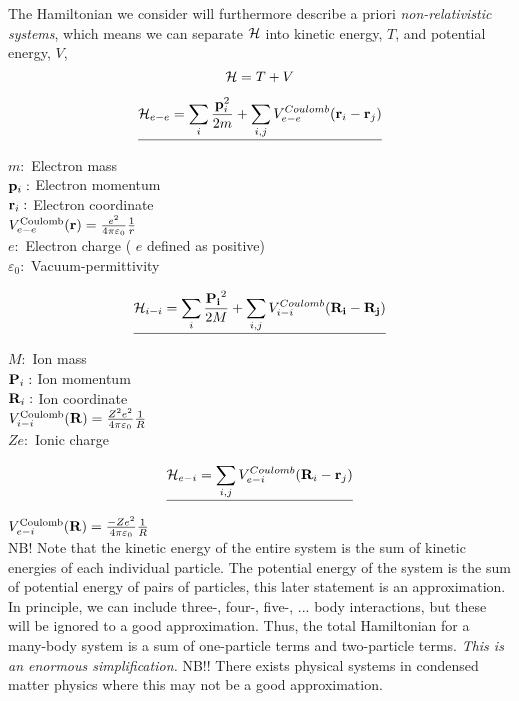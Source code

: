 \noindent The Hamiltonian we consider will furthermore describe a priori \emph{non-relativistic systems}, which means we can separate $\mathcal{H}$ into kinetic energy, $T$, and potential energy, $V$,
\begin{equation}
	\mathcal{H} = T+V
\end{equation}

\begin{equation}
	\emph{\mathcal{H}_{e-e}= \sum_{i} \frac{\vb{p}_i^2}{2m}+ \sum_{i,j} V_{e-e}^{Coulomb} (\vb{r}_i-\vb{r}_j)}
\end{equation}

\noindent $m:$ Electron mass\\
$\vb{p}_{i}:$ Electron momentum\\
$\vb{r}_{i}:$ Electron coordinate\\
$V_{e-e}^{\text{Coulomb}}(\vb{r})= \frac{e^2}{4\pi \varepsilon_0} \frac{1}{r}$ \\
$e:$ Electron charge ( $e$ defined as positive)\\
$\varepsilon_0:$ Vacuum-permittivity 

\begin{equation}
	\emph{\mathcal{H}_{i-i}= \sum_{i} \frac{\vb{P_i}^2}{2M}+ \sum_{i,j} V_{i-i}^{Coulomb} (\vb{R_i}-\vb{R_j})}
\end{equation}

\noindent $M:$ Ion mass\\
$\vb{P}_i:$ Ion momentum\\
$\vb{R}_i:$ Ion coordinate\\
$V_{i-i}^{\text{Coulomb}}(\vb{R})= \frac{Z^2e^2}{4\pi \varepsilon_0} \frac{1}{R}$\\
$Ze:$ Ionic charge

\begin{equation}
\emph{\mathcal{H}_{e-i}= \sum_{i,j} V_{e-i}^{Coulomb} (\vb{R}_i-\vb{r}_j)}
\end{equation}

\noindent $V_{e-i}^{\text{Coulomb}}(\vb{R})= \frac{-Ze^2}{4\pi \varepsilon_0} \frac{1}{R}$\\

\noindent NB! Note that the kinetic energy of the entire system is the sum of kinetic energies of each individual particle. The potential energy of the system is the sum of potential energy of pairs of particles, this later statement is an approximation. In principle, we can include three-, four-, five-, ... body interactions, but these will be ignored to a good approximation.
Thus, the total Hamiltonian for a many-body system is a sum of one-particle terms and two-particle terms. \emph{This is an enormous simplification.} NB!! There exists physical systems in condensed matter physics where this may not be a good approximation.\\
\linebreak


